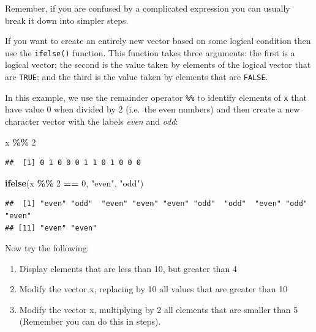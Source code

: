\documentclass[
]{book}
\newenvironment{Shaded}{\begin{snugshade}}{\end{snugshade}}
\newcommand{\DecValTok}[1]{\textcolor[rgb]{0.00,0.00,0.81}{#1}}
\newcommand{\FunctionTok}[1]{\textcolor[rgb]{0.13,0.29,0.53}{\textbf{#1}}}
\newcommand{\NormalTok}[1]{#1}
\newcommand{\SpecialCharTok}[1]{\textcolor[rgb]{0.81,0.36,0.00}{\textbf{#1}}}
\newcommand{\StringTok}[1]{\textcolor[rgb]{0.31,0.60,0.02}{#1}}
\providecommand{\tightlist}{%
  \setlength{\itemsep}{0pt}\setlength{\parskip}{0pt}}
\begin{document}
Remember, if you are confused by a complicated expression you can usually
break it down into simpler steps.

If you want to create an entirely new vector based on some logical
condition then use the \texttt{ifelse()} function. This function takes
three arguments: the first is a logical vector; the second is the
value taken by elements of the logical vector that are \texttt{TRUE}; and
the third is the value taken by elements that are \texttt{FALSE}.

In this example, we use the remainder operator \texttt{\%\%} to identify
elements of \texttt{x} that have value 0 when divided by 2 (i.e.~the even numbers)
and then create a new character vector with the labels \emph{even} and \emph{odd}:

\begin{Shaded}
\begin{Highlighting}[]
\NormalTok{x }\SpecialCharTok{\%\%} \DecValTok{2}
\end{Highlighting}
\end{Shaded}

\begin{verbatim}
##  [1] 0 1 0 0 0 1 1 0 1 0 0 0
\end{verbatim}

\begin{Shaded}
\begin{Highlighting}[]
\FunctionTok{ifelse}\NormalTok{(x }\SpecialCharTok{\%\%} \DecValTok{2} \SpecialCharTok{==} \DecValTok{0}\NormalTok{, }\StringTok{"even"}\NormalTok{, }\StringTok{"odd"}\NormalTok{)}
\end{Highlighting}
\end{Shaded}

\begin{verbatim}
##  [1] "even" "odd"  "even" "even" "even" "odd"  "odd"  "even" "odd"  "even"
## [11] "even" "even"
\end{verbatim}

Now try the following:

\begin{enumerate}
\def\labelenumi{\arabic{enumi}.}
\tightlist
\item
  Display elements that are less than 10, but greater than 4
\item
  Modify the vector x, replacing by 10 all values that are greater than 10
\item
  Modify the vector x, multiplying by 2 all elements that are smaller than 5 (Remember you can do this in steps).
\end{enumerate}
\end{document}
